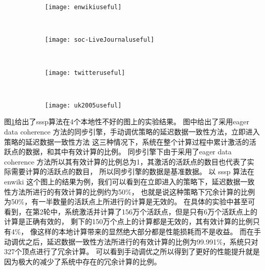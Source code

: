 \begin{figure}[!htbp]
  \centering
  \begin{subfigure}[b]{0.4\textwidth}
    \texttt{[image: enwikiuseful]}
    \caption{}
  \end{subfigure}%
  ~%
  \begin{subfigure}[b]{0.4\textwidth}
    \texttt{[image: soc-LiveJournaluseful]}
    \caption{}
  \end{subfigure}
  \\%
  \begin{subfigure}[b]{0.4\textwidth}
    \texttt{[image: twitteruseful]}
    \caption{}
  \end{subfigure}%
  ~%
  \begin{subfigure}[b]{0.4\textwidth}
    \texttt{[image: uk2005useful]}
    \caption{}
  \end{subfigure}
  \label{fig:useful}
\end{figure}
图\ref{fig:useful}给出了sssp算法在4个本地性不好的图上的实验结果。
图中给出了采用eager data coherence 方法的同步引擎，手动调优策略的延迟数据一致性方法，立即进入策略的延迟数据一致性方法
这三种情况下，系统在整个计算过程中累计激活的活跃点的数据，和其中有效计算的比例。
同步引擎下由于采用了eager data coherence 方法所以其有效计算的比例总为1，其激活的活跃点的数目也代表了实际需要计算的活跃点的数目，
所以同步引擎的数据是基准数据。
以 sssp 算法在 enwiki 这个图上的结果为例，我们可以看到在立即进入的策略下，延迟数据一致性方法所进行的有效计算的比例约为50\%，
也就是说这种策略下冗余计算的比例为50\%，有一半数量的活跃点上所进行的计算是无效的。
在具体的实验中甚至可看到，在第2轮中，系统激活并计算了156万个活跃点，但是只有6万个活跃点上的计算是正确有效的，
剩下的150万个点上的计算都是无效的，其有效计算的比例只有4\%，
像这样的本地计算带来的显然绝大部分都是性能损耗而不是收益。
而在手动调优之后，延迟数据一致性方法所进行的有效计算的比例为99.991\%，系统只对327个顶点进行了冗余计算。
可以看到手动调优之所以得到了更好的性能提升就是因为极大的减少了系统中存在的冗余计算的比例。


